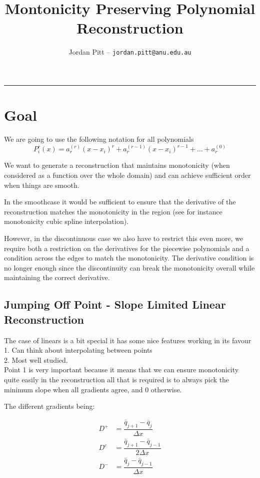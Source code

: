 \documentclass[10pt]{article}
\title{Montonicity Preserving Polynomial Reconstruction}
\author{Jordan Pitt -- \texttt{jordan.pitt@anu.edu.au}}
\begin{document}
\maketitle

\vspace{-0.3in}
\noindent
\rule{\linewidth}{0.4pt}

\section{Goal}
We are going to use the following notation for all polynomials
\[P^r_i(x) = a^{(r)}_r(x  - x_i)^r + a^{(r-1)}_r(x  - x_i)^{r-1} + \dots + a^{(0)}_r\]

We want to generate a reconstruction that maintains monotonicity (when considered as a function over the whole domain) and can achieve sufficient order when things are smooth.

In the smoothcase it would be sufficient to ensure that the derivative of the reconstruction matches the monotonicity in the region (see for instance monotonicity cubic spline interpolation).

However, in the discontinuous case we also have to restrict this even more, we require both a restriction on the derivatives for the piecewise polynomials and a condition across the edges to match the monotonicity. The derivative condition is no longer enough since  the discontinuity can break the monotonicity overall while maintaining the correct derivative. 

\subsection{Jumping Off Point - Slope Limited Linear Reconstruction}
The case of linears is a bit special it has some nice features working in its favour \\
1. Can think about interpolating between points \\
2. Most well studied.  \\

Point 1 is very important because it means that we can ensure monotonicity quite easily in the reconstruction all that is required is to always pick the minimum slope when all gradients agree, and 0 otherwise. 

The different gradients being:

\begin{align}
D^+ &= \dfrac{\bar{q}_{j+1} - \bar{q}_{j}}{\Delta x}  \\
D^c &= \dfrac{\bar{q}_{j+1} - \bar{q}_{j-1}}{2\Delta x}  \\
D^- &= \dfrac{\bar{q}_{j} - \bar{q}_{j-1}}{\Delta x}
\end{align}
\end{document}
